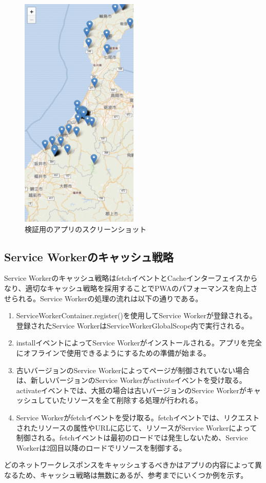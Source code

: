 \begin{figure}
  \centering
  \includegraphics[width=0.5\textwidth]{paper/images/app_screenshot.png}
  \caption{検証用のアプリのスクリーンショット}
  \label{figure:検証用のアプリのスクリーンショット}
\end{figure}

\subsection{Service Workerのキャッシュ戦略}
\label{Service Workerのキャッシュ戦略}
Service Workerのキャッシュ戦略はfetchイベントとCacheインターフェイスからなり、適切なキャッシュ戦略を採用することでPWAのパフォーマンスを向上させられる。Service Workerの処理の流れは以下の通りである。
\begin{enumerate}
    \item ServiceWorkerContainer.register()を使用してService Workerが登録される。登録されたService WorkerはServiceWorkerGlobalScope内で実行される。
    \item installイベントによってService Workerがインストールされる。アプリを完全にオフラインで使用できるようにするための準備が始まる。
    \item 古いバージョンのService Workerによってページが制御されていない場合は、新しいバージョンのService Workerがactivateイベントを受け取る。activateイベントでは、大抵の場合は古いバージョンのService Workerがキャッシュしていたリソースを全て削除する処理が行われる。
    \item Service Workerがfetchイベントを受け取る。fetchイベントでは、リクエストされたリソースの属性やURLに応じて、リソースがService Workerによって制御される。fetchイベントは最初のロードでは発生しないため、Service Workerは2回目以降のロードでリソースを制御する。
\end{enumerate}
どのネットワークレスポンスをキャッシュするべきかはアプリの内容によって異なるため、キャッシュ戦略は無数にあるが、参考までにいくつか例を示す。


